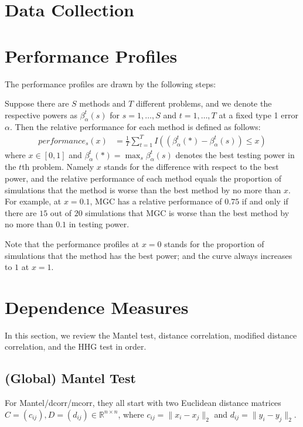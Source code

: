\documentclass[11pt]{article}
\newcommand{\Real}{\mathbb{R}}
\begin{document}
\section{Data Collection}



\section{Performance Profiles}

The performance profiles are drawn by the following steps:

Suppose there are $S$ methods and $T$ different problems, and we denote the respective powers as $\beta_{\alpha}^{t}(s)$ for $s=1,\ldots,S$ and $t=1,\ldots,T$ at a fixed type 1 error $\alpha$. Then the relative performance for each method is defined as follows:
\begin{align*}
performance_{s}(x) &= \frac{1}{T} \sum_{t=1}^{T} I((\beta_{\alpha}^{t}(*)-\beta_{\alpha}^{t}(s)) \leq x)
\end{align*}
where $x \in [0,1]$ and $\beta_{\alpha}^{t}(*) =\max_{s} \beta_{\alpha}^{t}(s)$ denotes the best testing power in the $t$th problem. Namely $x$ stands for the difference with respect to the best power, and the relative performance of each method equals the proportion of simulations that the method is worse than the best method by no more than $x$. For example, at $x=0.1$, MGC has a relative performance of $0.75$ if and only if there are $15$ out of $20$ simulations that MGC is worse than the best method by no more than $0.1$ in testing power. 

Note that the performance profiles at $x=0$ stands for the proportion of simulations that the method has the best power; and the curve always increases to $1$ at $x=1$. 

\section{Dependence Measures}
\label{main}



In this section, we review the Mantel test, distance correlation, modified distance correlation, and the HHG test in order.

\subsection{(Global) Mantel Test}
\label{sec:mantel}
For Mantel/dcorr/mcorr, they all start with two Euclidean distance matrices $C=(c_{ij}), D=(d_{ij}) \in \Real^{n \times n}$, where $c_{ij}=\|x_{i}-x_{j}\|_{2}$ and $d_{ij}=\|y_{i}-y_{j}\|_{2}$. 
\end{document}
